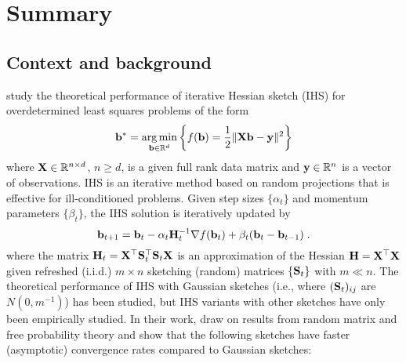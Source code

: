 

\section{Summary}

\subsection{Context and background}

\citet{Lacotte:2020} study the theoretical performance of iterative Hessian sketch (IHS) \citep{Pilanci:2016} for overdetermined least squares problems of the form
\[
\mathbf{b}^* = \operatorname*{arg\,min}_{\mathbf{b}\in\mathbb{R}^d}\left\{f(\mathbf{b}) = \frac{1}{2}\|\mathbf{X}\mathbf{b}-\mathbf{y}\|^2\right\}
\]
where $\mathbf{X}\in\mathbb{R}^{n\times d}$, $n\geq d$, is a given full rank data matrix and $\mathbf{y}\in\mathbb{R}^n$ is a vector of observations. IHS is an iterative method based on random projections that is effective for ill-conditioned problems. Given step sizes $\{\alpha_t\}$ and momentum parameters $\{\beta_t\}$, the IHS solution is iteratively updated by 
\[
\mathbf{b}_{t+1} = \mathbf{b}_t - \alpha_t\mathbf{H}_t^{-1}\nabla f(\mathbf{b}_t)+\beta_t(\mathbf{b}_t-\mathbf{b}_{t-1}) \;.
\]
where the matrix $\mathbf{H}_t=\mathbf{X}^\top \mathbf{S}_t^\top \mathbf{S}_t\mathbf{X}$ is an approximation of the Hessian $\mathbf{H}=\mathbf{X}^\top\mathbf{X}$ given refreshed (i.i.d.) $m\times n$ sketching (random) matrices $\{\mathbf{S}_t\}$ with $m\ll n$. The theoretical performance of IHS with Gaussian sketches (i.e., where $(\mathbf{S}_t)_{ij}$ are \iid $N(0,m^{-1})$) has been studied, but IHS variants with other sketches have only been empirically studied. In their work, \citet{Lacotte:2020} draw on results from random matrix and free probability theory and show that the following sketches have faster (asymptotic) convergence rates compared to Gaussian sketches:
